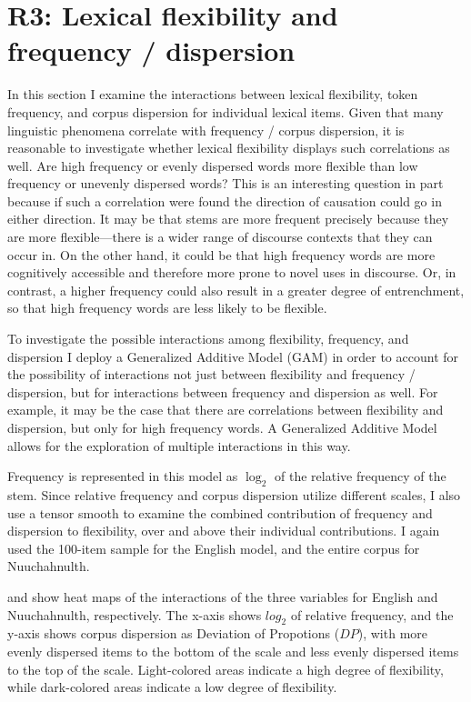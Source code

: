 \section{R3: Lexical flexibility and frequency / dispersion}
\label{sec:4.5}

In this section I examine the interactions between lexical flexibility, token frequency, and corpus dispersion for individual lexical items. Given that many linguistic phenomena correlate with frequency / corpus dispersion, it is reasonable to investigate whether lexical flexibility displays such correlations as well. Are high frequency or evenly dispersed words more flexible than low frequency or unevenly dispersed words? This is an interesting question in part because if such a correlation were found the direction of causation could go in either direction. It may be that stems are more frequent precisely because they are more flexible—there is a wider range of discourse contexts that they can occur in. On the other hand, it could be that high frequency words are more cognitively accessible and therefore more prone to novel uses in discourse. Or, in contrast, a higher frequency could also result in a greater degree of entrenchment, so that high frequency words are less likely to be flexible.

To investigate the possible interactions among flexibility, frequency, and dispersion I deploy a Generalized Additive Model (GAM) in order to account for the possibility of interactions not just between flexibility and frequency / dispersion, but for interactions between frequency and dispersion as well. For example, it may be the case that there are correlations between flexibility and dispersion, but only for high frequency words. A Generalized Additive Model allows for the exploration of multiple interactions in this way.

Frequency is represented in this model as $\log_2$ of the relative frequency of the stem. Since relative frequency and corpus dispersion utilize different scales, I also use a tensor smooth to examine the combined contribution of frequency and dispersion to flexibility, over and above their individual contributions. I again used the 100-item sample for the English model, and the entire corpus for Nuuchahnulth.

 and  show heat maps of the interactions of the three variables for English and Nuuchahnulth, respectively. The x-axis shows $log_2$ of relative frequency, and the y-axis shows corpus dispersion as Deviation of Propotions ($DP$), with more evenly dispersed items to the bottom of the scale and less evenly dispersed items to the top of the scale. Light-colored areas indicate a high degree of flexibility, while dark-colored areas indicate a low degree of flexibility.

